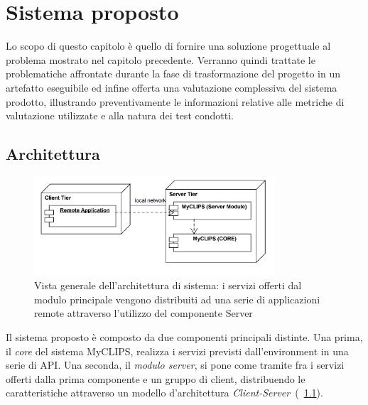 \chapter{Sistema proposto}

Lo scopo di questo capitolo è quello di fornire una soluzione progettuale al problema mostrato nel capitolo precedente. Verranno quindi trattate le problematiche affrontate durante la fase di trasformazione del progetto in un artefatto eseguibile ed infine offerta una valutazione complessiva del sistema prodotto, illustrando preventivamente le informazioni relative alle metriche di valutazione utilizzate e alla natura dei test condotti.

\section{Architettura}

\begin{figure}[h]
\centering
\includegraphics[width=0.8\textwidth]{Immagini/Capitolo3/Deployment/Client-Server.png}
\caption[Vista generale dell'architettura di sistema]{Vista generale dell'architettura di sistema: i servizi offerti dal modulo principale vengono distribuiti ad una serie di applicazioni remote attraverso l'utilizzo del componente Server}\label{fig:architettura-client-server}
\end{figure}

Il sistema proposto è composto da due componenti principali distinte. Una prima, il \emph{core} del sistema MyCLIPS, realizza i servizi previsti dall'environment in una serie di API. Una seconda, il \emph{modulo server}, si pone come tramite fra i servizi offerti dalla prima componente e un gruppo di client, distribuendo le caratteristiche attraverso un modello d'architettura \emph{Client-Server}~(\figurename~\ref{fig:architettura-client-server}).

